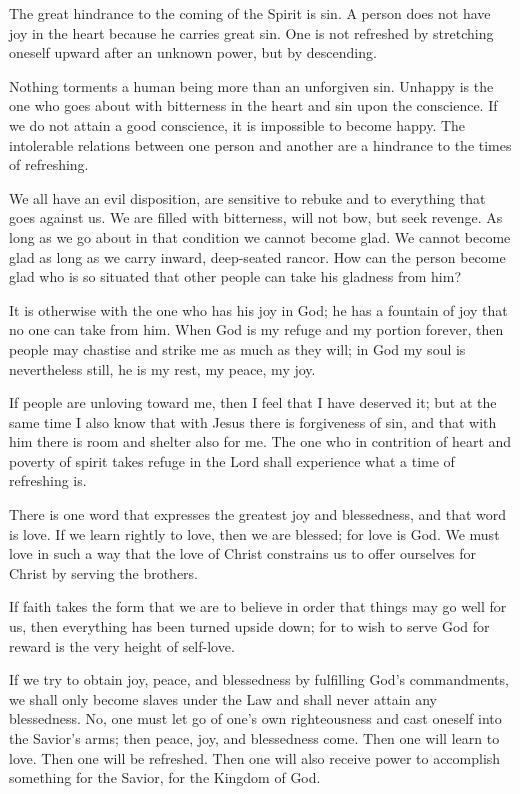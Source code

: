 The great hindrance to the coming of the Spirit is sin. A person does not have joy in the heart because he carries great sin. One is not refreshed by stretching oneself upward after an unknown power, but by descending.

Nothing torments a human being more than an unforgiven sin. Unhappy is the one who goes about with bitterness in the heart and sin upon the conscience. If we do not attain a good conscience, it is impossible to become happy. The intolerable relations between one person and another are a hindrance to the times of refreshing.

We all have an evil disposition, are sensitive to rebuke and to everything that goes against us. We are filled with bitterness, will not bow, but seek revenge. As long as we go about in that condition we cannot become glad. We cannot become glad as long as we carry inward, deep-seated rancor. How can the person become glad who is so situated that other people can take his gladness from him?

It is otherwise with the one who has his joy in God; he has a fountain of joy that no one can take from him. When God is my refuge and my portion forever, then people may chastise and strike me as much as they will; in God my soul is nevertheless still, he is my rest, my peace, my joy.

If people are unloving toward me, then I feel that I have deserved it; but at the same time I also know that with Jesus there is forgiveness of sin, and that with him there is room and shelter also for me. The one who in contrition of heart and poverty of spirit takes refuge in the Lord shall experience what a time of refreshing is.

There is one word that expresses the greatest joy and blessedness, and that word is love. If we learn rightly to love, then we are blessed; for love is God. We must love in such a way that the love of Christ constrains us to offer ourselves for Christ by serving the brothers.

If faith takes the form that we are to believe in order that things may go well for us, then everything has been turned upside down; for to wish to serve God for reward is the very height of self-love.

If we try to obtain joy, peace, and blessedness by fulfilling God’s commandments, we shall only become slaves under the Law and shall never attain any blessedness. No, one must let go of one’s own righteousness and cast oneself into the Savior’s arms; then peace, joy, and blessedness come. Then one will learn to love. Then one will be refreshed. Then one will also receive power to accomplish something for the Savior, for the Kingdom of God.

